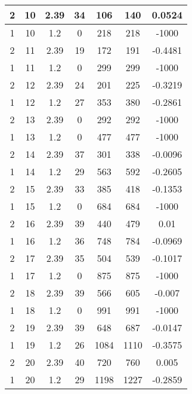 \documentclass[letterpaper, 12pt]{article}
\begin{document}
\begin{longtable}{|c|c|c|c|c|c|c|}
\hline
2 & 10 & 2.39 & 34 & 106 & 140 & 0.0524 \\
\hline
1 & 10 & 1.2 & 0 & 218 & 218 & -1000 \\
\hline
2 & 11 & 2.39 & 19 & 172 & 191 & -0.4481 \\
\hline
1 & 11 & 1.2 & 0 & 299 & 299 & -1000 \\
\hline
2 & 12 & 2.39 & 24 & 201 & 225 & -0.3219 \\
\hline
1 & 12 & 1.2 & 27 & 353 & 380 & -0.2861 \\
\hline
2 & 13 & 2.39 & 0 & 292 & 292 & -1000 \\
\hline
1 & 13 & 1.2 & 0 & 477 & 477 & -1000 \\
\hline
2 & 14 & 2.39 & 37 & 301 & 338 & -0.0096 \\
\hline
1 & 14 & 1.2 & 29 & 563 & 592 & -0.2605 \\
\hline
2 & 15 & 2.39 & 33 & 385 & 418 & -0.1353 \\
\hline
1 & 15 & 1.2 & 0 & 684 & 684 & -1000 \\
\hline
2 & 16 & 2.39 & 39 & 440 & 479 & 0.01 \\
\hline
1 & 16 & 1.2 & 36 & 748 & 784 & -0.0969 \\
\hline
2 & 17 & 2.39 & 35 & 504 & 539 & -0.1017 \\
\hline
1 & 17 & 1.2 & 0 & 875 & 875 & -1000 \\
\hline
2 & 18 & 2.39 & 39 & 566 & 605 & -0.007 \\
\hline
1 & 18 & 1.2 & 0 & 991 & 991 & -1000 \\
\hline
2 & 19 & 2.39 & 39 & 648 & 687 & -0.0147 \\
\hline
1 & 19 & 1.2 & 26 & 1084 & 1110 & -0.3575 \\
\hline
2 & 20 & 2.39 & 40 & 720 & 760 & 0.005 \\
\hline
1 & 20 & 1.2 & 29 & 1198 & 1227 & -0.2859 \\
\hline
\end{longtable}
\end{document}
